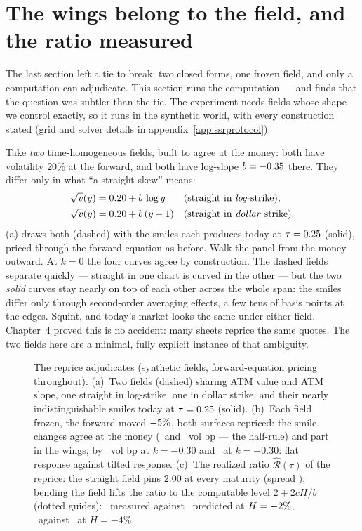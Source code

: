 \section{The wings belong to the field, and the ratio measured}
\label{sec:ssrfield}

The last section left a tie to break: two closed forms, one frozen
field, and only a computation can adjudicate.  This section runs the
computation --- and finds that the question was subtler than the tie.
The experiment needs fields whose shape we control exactly, so it runs
in the synthetic world, with every construction stated (grid and
solver details in appendix~\ref{app:ssrprotocol}).

Take \emph{two} time-homogeneous fields, built to agree at the money:
both have volatility $20\%$ at the forward, and both have log-slope
$b=-0.35$ there.  They differ only in what ``a straight
skew'' means:
\begin{align*}
\sqrt{v}(y)&=0.20+b\,\log y
&&\text{(straight in \emph{log}-strike)},\\
\sqrt{v}(y)&=0.20+b\,(y-1)
&&\text{(straight in \emph{dollar} strike)}.
\end{align*}
(a) draws both (dashed) with the smiles each
produces today at $\tau=0.25$ (solid), priced through the
forward equation as before.  Walk the panel from the money outward.
At $k=0$ the four curves agree by construction.  The dashed fields
separate quickly --- straight in one chart is curved in the other ---
but the two \emph{solid} curves stay nearly on top of each other
across the whole span: the smiles differ only through second-order
averaging effects, a few tens of basis points at the edges.  Squint,
and today's market looks the same under either field.  Chapter~4
proved this is no accident: many sheets reprice the same quotes.  The
two fields here are a minimal, fully explicit instance of that
ambiguity.

\begin{figure}[htbp]
\centering
{}
\caption{The reprice adjudicates (synthetic fields, forward-equation
pricing throughout).  (a)~Two fields (dashed) sharing ATM value and
ATM slope, one straight in log-strike, one in dollar strike, and
their nearly indistinguishable smiles today at
$\tau=0.25$ (solid).  (b)~Each field frozen, the forward
moved $-5\%$, both surfaces repriced: the smile
changes agree at the money (\MacSsrRepAtmLogBp\ and
\MacSsrRepAtmDlrBp\ vol bp --- the half-rule) and part in the wings,
by \MacSsrRepSepPutBp\ vol bp at $k=-0.30$ and \MacSsrRepSepCallBp\
at $k=+0.30$: flat response against tilted response.  (c)~The
realized ratio $\widehat{\mathcal{R}}(\tau)$ of the reprice: the
straight field pins $2.00$ at every maturity (spread
\MacSsrRepFlatSpread); bending the field lifts the ratio to the
computable level $2+2cH/b$ (dotted guides): \MacSsrRepBentMean\
measured against \MacSsrRepBentPred\ predicted at
$H=-2\%$, \MacSsrRepBentBigMean\ against
\MacSsrRepBentBigPred\ at $H=-4\%$.}
\label{fig:ssrreprice}
\end{figure}

